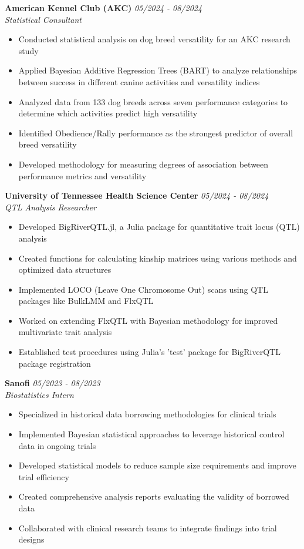 \documentclass[11pt,a4paper]{article}
\newcommand{\entry}[4]{
  \noindent\textbf{#1} \hfill \textit{#2}\\
  \textit{#3}\\
  #4
  \vspace{0.4cm}
}
\begin{document}
\entry{American Kennel Club (AKC)}{05/2024 - 08/2024}{Statistical Consultant}{
  \begin{itemize}[leftmargin=*,noitemsep,topsep=0pt]
    \item Conducted statistical analysis on dog breed versatility for an AKC research study
    \item Applied Bayesian Additive Regression Trees (BART) to analyze relationships between success in different canine activities and versatility indices
    \item Analyzed data from 133 dog breeds across seven performance categories to determine which activities predict high versatility
    \item Identified Obedience/Rally performance as the strongest predictor of overall breed versatility
    \item Developed methodology for measuring degrees of association between performance metrics and versatility
  \end{itemize}
}

\entry{University of Tennessee Health Science Center}{05/2024 - 08/2024}{QTL Analysis Researcher}{
  \begin{itemize}[leftmargin=*,noitemsep,topsep=0pt]
    \item Developed BigRiverQTL.jl, a Julia package for quantitative trait locus (QTL) analysis
    \item Created functions for calculating kinship matrices using various methods and optimized data structures
    \item Implemented LOCO (Leave One Chromosome Out) scans using QTL packages like BulkLMM and FlxQTL
    \item Worked on extending FlxQTL with Bayesian methodology for improved multivariate trait analysis
    \item Established test procedures using Julia's 'test' package for BigRiverQTL package registration
  \end{itemize}
}

\entry{Sanofi}{05/2023 - 08/2023}{Biostatistics Intern}{
  \begin{itemize}[leftmargin=*,noitemsep,topsep=0pt]
    \item Specialized in historical data borrowing methodologies for clinical trials
    \item Implemented Bayesian statistical approaches to leverage historical control data in ongoing trials
    \item Developed statistical models to reduce sample size requirements and improve trial efficiency
    \item Created comprehensive analysis reports evaluating the validity of borrowed data
    \item Collaborated with clinical research teams to integrate findings into trial designs
  \end{itemize}
}
\end{document}
